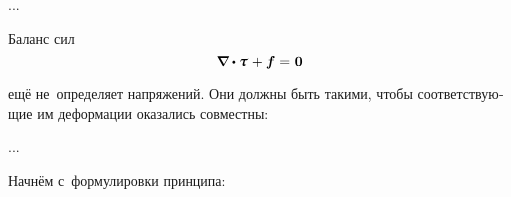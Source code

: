 \begin{otherlanguage}{russian}
...





Баланс сил
\nopagebreak\vspace{-0.32em}\begin{equation}\label{balanceofforces}
\boldnabla \dotp \mathboldtau \hspace{0.15ex} + \bm{f} = \hspace{0.1ex} \bm{0}
\end{equation}

\vspace{-0.5em} \noindent ещё не~определяет напряжений. Они должны быть такими, чтобы соответствующие им деформации оказались совместны:

...






\label{para:principleofminimumpotentialenergy}

Начнём с~формулировки принципа:


\end{otherlanguage}
